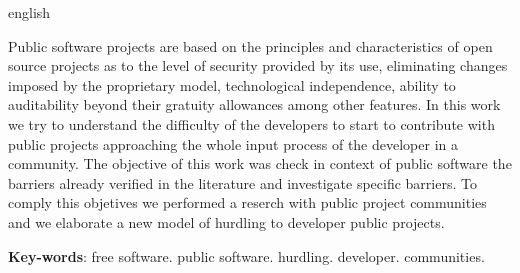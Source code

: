\begin{resumo}[Abstract]
 \begin{otherlanguage*}{english}
   
Public software projects are based on the principles and characteristics of open source projects as
to the level of security provided by its use, eliminating changes
imposed by the proprietary model, technological independence, ability to
auditability beyond their gratuity allowances among other features.
%
In this work we try to understand the difficulty of the developers to start
to contribute with public projects approaching the whole input process of
the developer in a community.
%
The objective of this work was check in context of public software the barriers
already verified in the literature and investigate specific barriers.
%
To comply this objetives we performed a reserch with public project communities
and we elaborate a new model of hurdling to developer public projects.

   \vspace{\onelineskip}
 
   \noindent 
   \textbf{Key-words}: free software. public software. hurdling. developer. communities.
 \end{otherlanguage*}
\end{resumo}
